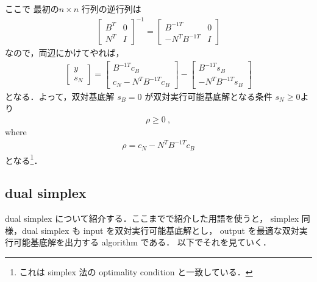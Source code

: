 \documentclass[11pt, a4]{article}
\begin{document}
ここで 最初の$n\times n$ 行列の逆行列は
\begin{eqnarray}
    \left[
    \begin{array}{c|c}
      B^T&0\nonumber\\
      \hline
      N^T&I
    \end{array}
    \right]^{-1} =
    \left[
    \begin{array}{c|c}
      B^{-1 T}&0\nonumber\\
      \hline
      -N^TB^{-1 T}&I
    \end{array}
    \right]    
\end{eqnarray}
なので，両辺にかけてやれば，
\begin{eqnarray}
    \left[
    \begin{array}{c}
      y\nonumber\\
      \hline
      s_N
    \end{array}
    \right]  
  =
  \left[
    \begin{array}{c}
      B^{-1 T}c_B\nonumber\\
      \hline
      c_N - N^T B^{-1 T}c_B
    \end{array}
    \right] -
    \left[
    \begin{array}{c}
      B^{-1T}s_B\nonumber\\
      \hline
      -N^TB^{-1 T} s_B
    \end{array}
    \right]
    \label{modified_const}
\end{eqnarray}
となる．よって，双対基底解 $s_B = 0$ が双対実行可能基底解となる条件 $s_N\geq 0$より
\begin{eqnarray}
  \rho \geq 0\ ,
\end{eqnarray}
where 
\begin{eqnarray}
  \rho = c_N - N^T B^{-1 T} c_B
  \label{def_rho}
\end{eqnarray}
となる\footnote{これは simplex 法の optimality condition と一致している．}．

\subsection{dual simplex}
dual simplex について紹介する．ここまでで紹介した用語を使うと，
simplex 同様，dual simplex も input を双対実行可能基底解とし，
output を最適な双対実行可能基底解を出力する algorithm である．
以下でそれを見ていく．
\end{document}
